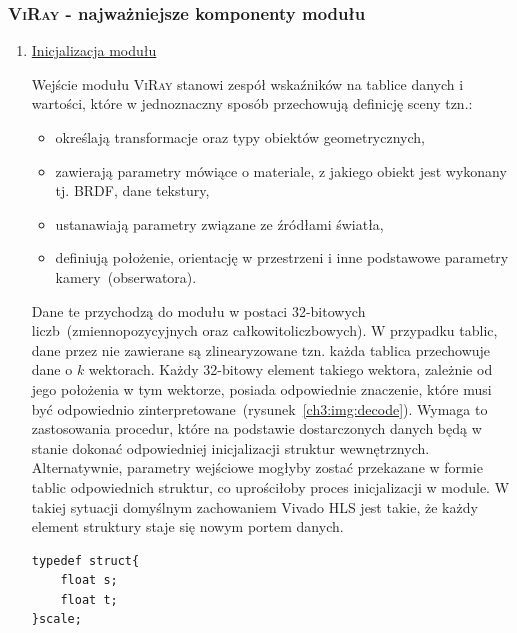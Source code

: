 \subsubsection{\textsc{ViRay} - najważniejsze komponenty modułu}
\begin{enumerate}


\item \underline{Inicjalizacja modułu}

Wejście modułu \textsc{ViRay} stanowi zespół wskaźników na tablice danych i wartości, które w jednoznaczny sposób przechowują definicję sceny tzn.:
\begin{itemize}
\item określają transformacje oraz typy obiektów geometrycznych,
\item zawierają parametry mówiące o materiale, z jakiego obiekt jest wykonany tj. BRDF, dane tekstury,
\item ustanawiają parametry związane ze źródłami światła,
\item definiują położenie, orientację w przestrzeni i inne podstawowe parametry kamery~(obserwatora).
\end{itemize}
Dane te przychodzą do modułu w postaci 32-bitowych liczb~(zmiennopozycyjnych oraz całkowitoliczbowych). W przypadku tablic, dane przez nie zawierane są zlinearyzowane tzn. każda tablica przechowuje dane o $k$ wektorach. Każdy 32-bitowy element takiego wektora, zależnie od jego położenia w tym wektorze, posiada odpowiednie znaczenie, które musi być odpowiednio zinterpretowane~(rysunek~\ref{ch3:img:decode}). Wymaga to zastosowania procedur, które na podstawie dostarczonych danych będą w stanie dokonać odpowiedniej inicjalizacji struktur wewnętrznych.
Alternatywnie, parametry wejściowe mogłyby zostać przekazane w formie tablic odpowiednich struktur, co uprościłoby proces inicjalizacji w module. W takiej sytuacji domyślnym zachowaniem Vivado HLS jest takie, że każdy element struktury staje się nowym portem danych.
\begin{lstlisting}
typedef struct{
	float s;
	float t;
}scale;
\end{lstlisting}

\end{enumerate}
